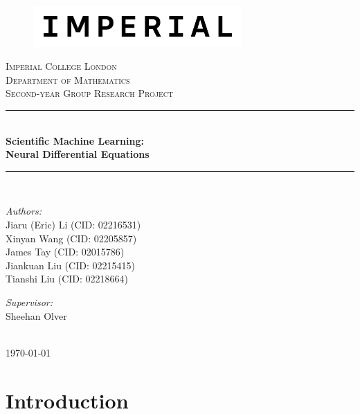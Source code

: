 \documentclass[a4paper,11pt,titlepage]{article}
\theoremstyle{definition}
\theoremstyle{plain}
\theoremstyle{remark}
\newcommand{\reporttitle}{Scientific Machine Learning:\\Neural Differential Equations}
\newcommand{\reportauthorA}{Jiaru (Eric) Li (CID: 02216531)}
\newcommand{\reportauthorB}{Xinyan Wang (CID: 02205857)}
\newcommand{\reportauthorC}{James Tay (CID: 02015786)}
\newcommand{\reportauthorD}{Jiankuan Liu (CID: 02215415)}
\newcommand{\reportauthorE}{Tianshi Liu (CID: 02218664)}
\newcommand{\supervisor}{Sheehan Olver}
\begin{document}
\begin{titlepage}
\newcommand{\HRule}{\rule{\linewidth}{0.5mm}}
\begin{figure}[h]
  \includegraphics[width=8cm]{figures/Imperial_logo.png}
  \vspace{1cm}
\end{figure}
\center
\textsc{\LARGE Imperial College London}\\[0.5cm] 
\textsc{\Large Department of Mathematics}\\[1.5cm] 
\textsc{\Large Second-year Group Research Project}\\[0.5cm]
\makeatletter
\HRule\\[0.6cm]
{\huge\bfseries\reporttitle}\\[0.6cm]
\HRule\\[1.5cm]
\begin{minipage}{0.4\textwidth}
\begin{flushleft}\large
\emph{Authors:}\\
\reportauthorA\\
\reportauthorB\\
\reportauthorC\\
\reportauthorD\\
\reportauthorE
\end{flushleft}
\end{minipage}
\begin{minipage}{0.4\textwidth}
\begin{flushright}\large
\emph{Supervisor:}\\
\supervisor
\end{flushright}
\end{minipage}\\[2cm]
\makeatother
\vfill
\makeatletter
{\large\today}\\[2cm]
\makeatother
\end{titlepage}

\begin{abstract}

\end{abstract}

\tableofcontents

\pagebreak
\section{Introduction}
\end{document}
